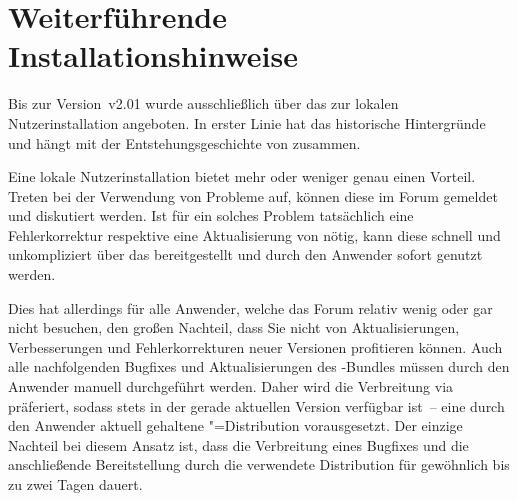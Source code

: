 \chapter{Weiterführende Installationshinweise}
%
\noindent{}

\bigskip\noindent
Bis zur Version~v2.01 wurde \TUDScript ausschließlich über das \Forum zur 
lokalen Nutzerinstallation angeboten. In erster Linie hat das historische 
Hintergründe und hängt mit der Entstehungsgeschichte von \TUDScript zusammen. 

Eine lokale Nutzerinstallation bietet mehr oder weniger genau einen Vorteil. 
Treten bei der Verwendung von \TUDScript Probleme auf, können diese im Forum 
gemeldet und diskutiert werden. Ist für ein solches Problem tatsächlich eine 
Fehlerkorrektur respektive eine Aktualisierung von \TUDScript nötig, kann 
diese schnell und unkompliziert über das \GitHubRepo bereitgestellt und durch 
den Anwender sofort genutzt werden.

Dies hat allerdings für alle Anwender, welche das Forum relativ wenig oder gar 
nicht besuchen, den großen Nachteil, dass Sie nicht von Aktualisierungen, 
Verbesserungen und Fehlerkorrekturen neuer Versionen profitieren können. Auch 
alle nachfolgenden Bugfixes und Aktualisierungen des \TUDScript-Bundles müssen 
durch den Anwender manuell durchgeführt werden. Daher wird die Verbreitung via 
 präferiert, sodass \TUDScript stets in der gerade aktuellen 
Version verfügbar ist~-- eine durch den Anwender aktuell gehaltene 
"=Distribution vorausgesetzt. Der einzige Nachteil bei diesem 
Ansatz ist, dass die Verbreitung eines Bugfixes und die anschließende 
Bereitstellung durch die verwendete Distribution für gewöhnlich bis zu zwei 
Tagen dauert.

